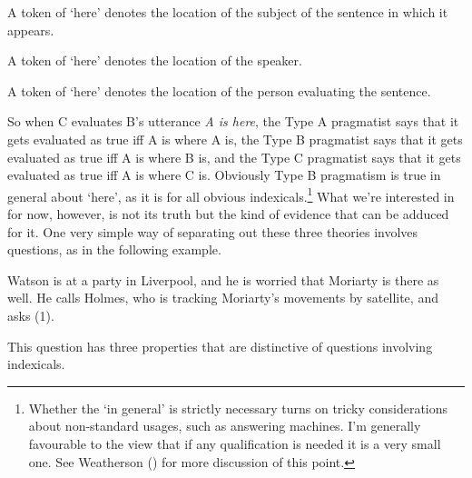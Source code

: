 \documentclass[
  10pt,
  letterpaper,
  DIV=11,
  numbers=noendperiod,
  twoside]{scrartcl}
\providecommand{\tightlist}{%
  \setlength{\itemsep}{0pt}\setlength{\parskip}{0pt}}\usepackage{longtable,booktabs,array}
\begin{document}
\begin{description}
\tightlist
\item[Type A pragmatism]
A token of `here' denotes the location of the subject of the sentence in
which it appears.
\item[Type B pragmatism]
A token of `here' denotes the location of the speaker.
\item[Type C pragmatism]
A token of `here' denotes the location of the person evaluating the
sentence.
\end{description}

So when C evaluates B's utterance \emph{A is here}, the Type A
pragmatist says that it gets evaluated as true iff A is where A is, the
Type B pragmatist says that it gets evaluated as true iff A is where B
is, and the Type C pragmatist says that it gets evaluated as true iff A
is where C is. Obviously Type B pragmatism is true in general about
`here', as it is for all obvious indexicals.\footnote{Whether the `in
  general' is strictly necessary turns on tricky considerations about
  non-standard usages, such as answering machines. I'm generally
  favourable to the view that if any qualification is needed it is a
  very small one. See Weatherson
  () for more discussion of
  this point.} What we're interested in for now, however, is not its
truth but the kind of evidence that can be adduced for it. One very
simple way of separating out these three theories involves questions, as
in the following example.

Watson is at a party in Liverpool, and he is worried that Moriarty is
there as well. He calls Holmes, who is tracking Moriarty's movements by
satellite, and asks (1).

This question has three properties that are distinctive of questions
involving indexicals.
\end{document}
